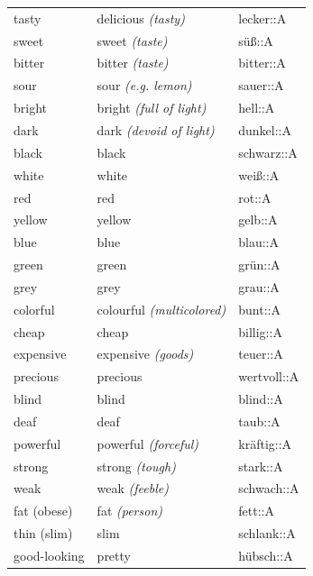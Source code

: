 \begin{center}
\begin{longtable}{lll}
{\sc \lowercase{	TASTY	}}	&	delicious	\textit{\footnotesize (tasty)}	&	lecker::A	\\
{\sc \lowercase{	SWEET	}}	&	sweet	\textit{\footnotesize (taste)}	&	süß::A	\\
{\sc \lowercase{	BITTER	}}	&	bitter	\textit{\footnotesize (taste)}	&	bitter::A	\\
{\sc \lowercase{	SOUR	}}	&	sour	\textit{\footnotesize (e.g. lemon)}	&	sauer::A	\\
{\sc \lowercase{	BRIGHT	}}	&	bright	\textit{\footnotesize (full of light)}	&	hell::A	\\
{\sc \lowercase{	DARK	}}	&	dark	\textit{\footnotesize (devoid of light)}	&	dunkel::A	\\
{\sc \lowercase{	BLACK	}}	&	black		&	schwarz::A	\\
{\sc \lowercase{	WHITE	}}	&	white		&	weiß::A	\\
{\sc \lowercase{	RED	}}	&	red		&	rot::A	\\
{\sc \lowercase{	YELLOW	}}	&	yellow		&	gelb::A	\\
{\sc \lowercase{	BLUE	}}	&	blue		&	blau::A	\\
{\sc \lowercase{	GREEN	}}	&	green		&	grün::A	\\
{\sc \lowercase{	GREY	}}	&	grey		&	grau::A	\\
{\sc \lowercase{	COLORFUL	}}	&	colourful	\textit{\footnotesize (multicolored)}	&	bunt::A	\\
{\sc \lowercase{	CHEAP	}}	&	cheap		&	billig::A	\\
{\sc \lowercase{	EXPENSIVE	}}	&	expensive	\textit{\footnotesize (goods)}	&	teuer::A	\\
{\sc \lowercase{	PRECIOUS	}}	&	precious		&	wertvoll::A	\\
{\sc \lowercase{	BLIND	}}	&	blind		&	blind::A	\\
{\sc \lowercase{	DEAF	}}	&	deaf		&	taub::A	\\
{\sc \lowercase{	POWERFUL	}}	&	powerful	\textit{\footnotesize (forceful)}	&	kräftig::A	\\
{\sc \lowercase{	STRONG	}}	&	strong 	\textit{\footnotesize (tough)}	&	stark::A	\\
{\sc \lowercase{	WEAK	}}	&	weak	\textit{\footnotesize (feeble)}	&	schwach::A	\\
{\sc \lowercase{	FAT \footnotesize (OBESE)	}}	&	fat	\textit{\footnotesize (person)}	&	fett::A	\\
{\sc \lowercase{	THIN \footnotesize (SLIM)	}}	&	slim		&	schlank::A	\\
{\sc \lowercase{	GOOD-LOOKING	}}	&	pretty		&	hübsch::A	\\

\end{longtable}
\end{center}
